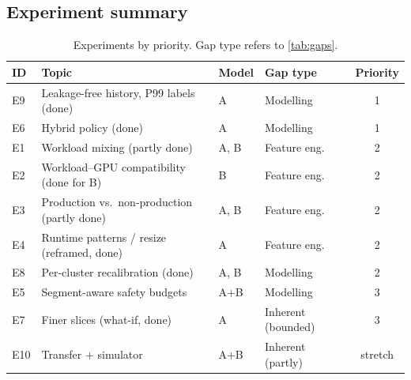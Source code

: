 \subsection{Experiment summary}

\begin{table}[h]
\centering\small
\caption{Experiments by priority. Gap type refers to \cref{tab:gaps}.}
\label{tab:expsummary}
\begin{tabular}{@{}llllc@{}}
\toprule
ID & Topic & Model & Gap type & Priority \\
\midrule
E9 & Leakage-free history, P99 labels (done) & A & Modelling & 1 \\
E6 & Hybrid policy (done) & A & Modelling & 1 \\
E1 & Workload mixing (partly done) & A, B & Feature eng. & 2 \\
E2 & Workload--GPU compatibility (done for B) & B & Feature eng. & 2 \\
E3 & Production vs.\ non-production (partly done) & A, B & Feature eng. & 2 \\
E4 & Runtime patterns / resize (reframed, done) & A & Feature eng. & 2 \\
E8 & Per-cluster recalibration (done) & A, B & Modelling & 2 \\
E5 & Segment-aware safety budgets & A+B & Modelling & 3 \\
E7 & Finer slices (what-if, done) & A & Inherent (bounded) & 3 \\
E10 & Transfer + simulator & A+B & Inherent (partly) & stretch \\
\bottomrule
\end{tabular}
\end{table}
